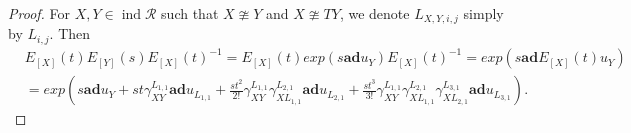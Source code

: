 \documentclass[12pt]{amsart}
\begin{document}
\begin{proof}
    For $X,Y\in \operatorname{ind}\mathcal{R}$ such that $X\ncong Y$ and $X \ncong TY$, we denote $L_{X,Y,i,j}$ simply by $L_{i,j}$. Then
    \begin{align*}
        &E_{[X]}(t) E_{[Y]}(s) E_{[X]}(t)^{-1} = E_{[X]}(t) exp (s \mathbf{ad}u_Y)  E_{[X]}(t)^{-1}  = exp(s \mathbf{ad} E_{[X]}(t)u_Y)\\
         &= exp(s\mathbf{ad}u_Y + st\gamma_{XY}^{L_{1,1}}\mathbf{ad}u_{L_{1,1}} + \frac{st^2}{2!}\gamma_{XY}^{L_{1,1}}\gamma_{XL_{1,1}}^{L_{2,1}}\mathbf{ad}u_{L_{2,1}} + \frac{st^3}{3!}\gamma_{XY}^{L_{1,1}}\gamma_{XL_{1,1}}^{L_{2,1}}\gamma_{XL_{2,1}}^{L_{3,1}}\mathbf{ad}u_{L_{3,1}} ) .
    \end{align*}

%





\end{proof}
\end{document}
